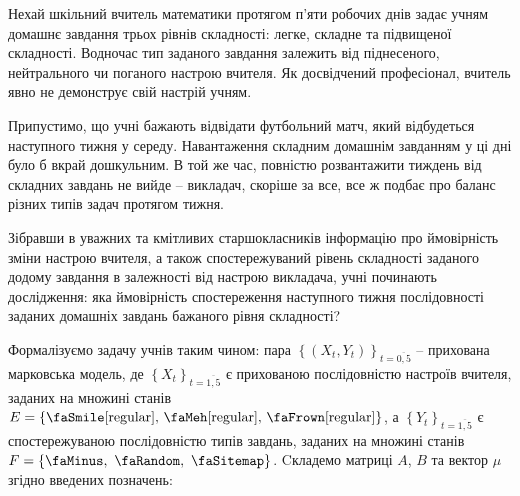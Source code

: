 \vspace{0.2cm}
\begin{mdframed}[style=text box, topline=false, bottomline=false, rightmargin=0cm, leftmargin=0cm]
    \hspace{\tabsize}
    Нехай шкільний вчитель математики протягом п'яти робочих днів задає учням домашнє завдання трьох рівнів складності: легке, складне та підвищеної складності. Водночас тип заданого завдання залежить від піднесеного, нейтрального чи поганого настрою вчителя. Як досвідчений професіонал, вчитель явно не демонструє свій настрій учням. 
    
    Припустимо, що учні бажають відвідати футбольний матч, який відбудеться наступного тижня у середу. Навантаження складним домашнім завданням у ці дні було б вкрай дошкульним. В той же час, повністю розвантажити тиждень від складних завдань не вийде -- викладач, скоріше за все, все ж подбає про баланс різних типів задач протягом тижня.
    
    Зібравши в уважних та кмітливих старшокласників інформацію про ймовірність зміни настрою вчителя, а також спостережуваний рівень складності заданого додому завдання в залежності від настрою викладача, учні починають дослідження: яка ймовірність спостереження наступного тижня послідовності заданих домашніх завдань бажаного рівня складності?
\end{mdframed}

Формалізуємо задачу учнів таким чином: пара $\left\{(X_t,Y_t)\right\}_{t=\overline{0,5}}$ -- прихована марковська модель, де $\left\{ X_t \right\}_{t=\overline{1,5}}$ є прихованою послідовністю настроїв вчителя, заданих на множині станів $E=\left\{\text{\faSmile[regular], \faMeh[regular], \faFrown[regular]}\right\}$, а $\left\{ Y_t \right\}_{t=\overline{1,5}}$ є спостережуваною послідовністю типів завдань, заданих на множині станів $F=\left\{ \text{\faMinus},\ \text{\faRandom},\ \text{\faSitemap} \right\}$. Cкладемо матриці $A$, $B$ та вектор $\mu$ згідно введених позначень:

